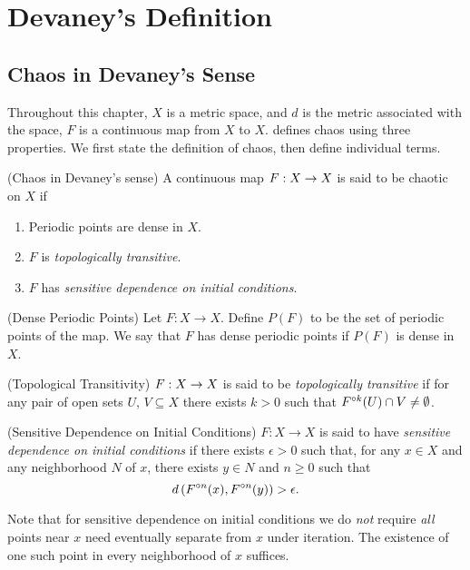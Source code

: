 \documentclass[12pt,draft,twoside]{book}
\begin{document}
\chapter{Devaney's Definition}
\label{chap:devaney}
\section{Chaos in Devaney's Sense}
Throughout this chapter, $X$ is a metric space, and $d$ is the metric associated with the space, $F$ is a continuous map from $X$ to $X$.
\citet{devaney} defines chaos using three properties.
We first state the definition of chaos, then define individual terms.
\begin{definition}
  (Chaos in Devaney's sense) 
  A continuous map $F: X\rightarrow X$ is said to be chaotic on $X$ if
  \begin{enumerate}
    \item Periodic points are dense in $X$.
    \item $F$ is \textit{topologically transitive}.
    \item $F$ has \textit{sensitive dependence on initial conditions}.
  \end{enumerate}
\end{definition}
%
\begin{definition}
  (Dense Periodic Points) 
  Let $F: X \to X$.
  Define $P(F)$ to be the set of periodic points of the map.
  We say that $F$ has dense periodic points if $P(F)$ is dense in $X$.
\end{definition}
%
\begin{definition}
  (Topological Transitivity) 
  $F: X \rightarrow X$ is said to be \textit{topologically transitive} if for any pair of open sets $U$, $V \subseteq X$ there exists $k > 0$ such that $F^{\circ k}(U) \cap V \neq \emptyset$.
  \label{defn:transitivity}
\end{definition}
%
\begin{definition}
  (Sensitive Dependence on Initial Conditions) 
  $F: X \rightarrow X$ is said to have \textit{sensitive dependence on initial conditions} if there exists $\epsilon > 0$ such that, for any $x \in X$ and any neighborhood $N$ of $x$, there exists $y\in N$ and $n\geq 0$ such that 
  \begin{equation*}
    d\left( F^{\circ n}(x), F^{\circ n}(y) \right) > \epsilon.
  \end{equation*}
  \label{defn:sdic}
\end{definition}
%
\noindent Note that for sensitive dependence on initial conditions we do \textit{not} require \textit{all} points near $x$ need eventually separate from $x$ under iteration.
The existence of one such point in every neighborhood of $x$ suffices.
\end{document}
